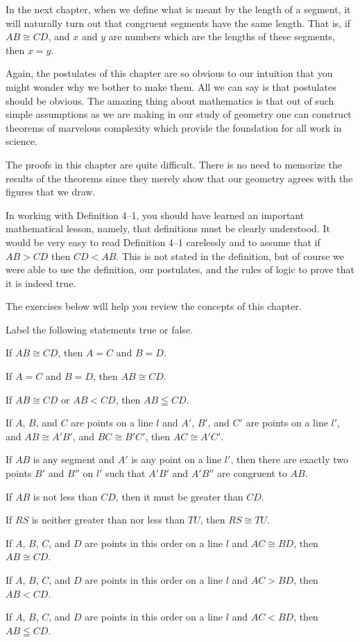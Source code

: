 \documentclass[11pt]{book}
\theoremstyle{bkplain}
\theoremstyle{XIplainnote}
\theoremstyle{bkplain}
\theoremstyle{bkplain}
\begin{document}
\begin{exercisecols}
In the next chapter, when we define what is meant by the length of a segment, it
will naturally turn out that congruent segments have the same length. That is, if
$AB \cong CD$, and $x$ and $y$ are numbers which are the lengths of these
segments, then $x = y$.

Again, the postulates of this chapter are so obvious to our intuition that you
might wonder why we bother to make them. All we can say is that postulates should
be obvious. The amazing thing about mathematics is that out of such simple
assumptions as we are making in our study of geometry one can construct theorems
of marvelous complexity which provide the foundation for all work in science.

The proofs in this chapter are quite difficult. There is no need to memorize the
results of the theorems since they merely show that our geometry agrees with the
figures that we draw.

In working with Definition 4--1, you should have learned an important
mathematical lesson, namely, that definitions must be clearly understood. It
would be very easy to read Definition 4--1 carelessly and to assume that if
$AB > CD$ then $CD < AB$. This is not stated in the definition, but of course we
were able to use the definition, our postulates, and the rules of logic to prove
that it is indeed true.

The exercises below will help you review the concepts of this chapter.

\medskip
Label the following statements true or false.

\begin{exlist}
\item If $AB \cong CD$, then $A = C$ and $B = D$.
\item If $A = C$ and $B = D$, then $AB \cong CD$.
\item If $AB \cong CD$ or $AB < CD$, then $AB \leqq CD$.
\item If $A$, $B$, and $C$ are points on a line $l$ and $A'$, $B'$, and $C'$ are
      points on a line $l'$, and $AB \cong A'B'$, and $BC \cong B'C'$, then
      $AC \cong A'C'$.
\item If $AB$ is any segment and $A'$ is any point on a line $l'$, then there are
      exactly two points $B'$ and $B''$ on $l'$ such that $A'B'$ and $A'B''$ are
      congruent to $AB$.
\item If $AB$ is not less than $CD$, then it must be greater than $CD$.
\item If $RS$ is neither greater than nor less than $TU$, then $RS \cong TU$.
\item If $A$, $B$, $C$, and $D$ are points in this order on a line $l$ and
      $AC \cong BD$, then $AB \cong CD$.
\item If $A$, $B$, $C$, and $D$ are points in this order on a line $l$ and
      $AC > BD$, then $AB < CD$.
\item If $A$, $B$, $C$, and $D$ are points in this order on a line $l$ and
      $AC < BD$, then $AB \leqq CD$.
\end{exlist}


\end{exercisecols}
\end{document}
